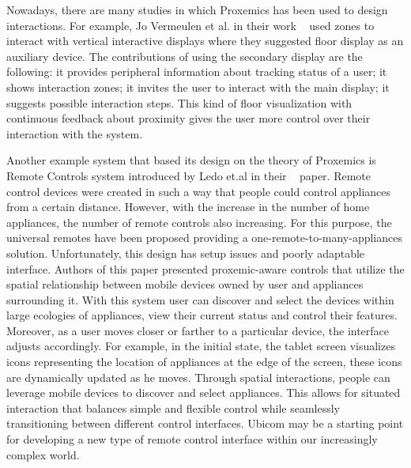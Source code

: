 \par Nowadays, there are many studies in which Proxemics has been used to design interactions. For example, Jo Vermeulen et al. in their work ~\cite{vermeulen2015proxemic} used zones to interact with vertical interactive displays where they suggested floor display as an auxiliary device. The contributions of using the secondary display are the following: it provides peripheral information about tracking status of a user; it shows interaction zones; it invites the user to interact with the main display; it suggests possible interaction steps. This kind of floor visualization with continuous feedback about proximity gives the user more control over their interaction with the system.

\par Another example system that based its design on the theory of Proxemics is Remote Controls system introduced by Ledo et.al in their ~\cite{ledo2015proxemic} paper. Remote control devices were created in such a way that people could control appliances from a certain distance. However, with the increase in the number of home appliances, the number of remote controls also increasing. For this purpose, the universal remotes have been proposed providing a one-remote-to-many-appliances solution. Unfortunately, this design has setup issues and poorly adaptable interface. Authors of this paper presented proxemic-aware controls that utilize the spatial relationship between mobile devices owned by user and appliances surrounding it. With this system user can discover and select the devices within large ecologies of appliances, view their current status and control their features. Moreover, as a user moves closer or farther to a particular device, the interface adjusts accordingly. 
For example, in the initial state, the tablet screen visualizes icons representing the location of appliances at the edge of the screen, these icons are dynamically updated as he moves. Through spatial interactions, people can leverage mobile devices to discover and select appliances. This allows for situated interaction that balances simple and flexible control while seamlessly transitioning between different control interfaces. Ubicom may be a starting point for developing a new type of remote control interface within our increasingly complex world.

